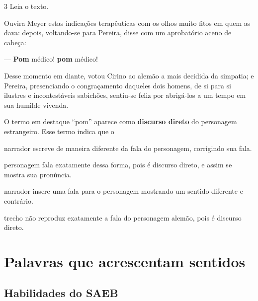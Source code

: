 \num{3} Leia o texto.

\begin{myquote}
Ouvira Meyer estas indicações terapêuticas com os olhos muito fitos em
quem as dava: depois, voltando-se para Pereira, disse com um aprobatório
aceno de cabeça:

— \textbf{Pom} médico! \textbf{pom} médico!

Desse momento em diante, votou Cirino ao alemão a mais decidida da
simpatia; e Pereira, presenciando o congraçamento daqueles dois homens,
de si para si ilustres e incontestáveis sabichões, sentiu-se feliz por
abrigá-los a um tempo em sua humilde vivenda.

\end{myquote}

\noindent{}O termo em destaque “pom” aparece como \textbf{discurso direto} do
personagem estrangeiro. Esse termo indica que o

\begin{escolha}
\item narrador escreve de maneira diferente da fala do personagem,
corrigindo sua fala.

\item personagem fala exatamente dessa forma, pois é discurso direto,
e assim se mostra sua pronúncia.

\item narrador insere uma fala para o personagem mostrando um sentido
diferente e contrário.

\item trecho não reproduz exatamente a fala do personagem alemão,
pois é discurso direto.
\end{escolha}



\chapter[Palavras que acrescentam sentidos]{\Large Palavras que acrescentam sentidos}


\section*{Habilidades do SAEB}

